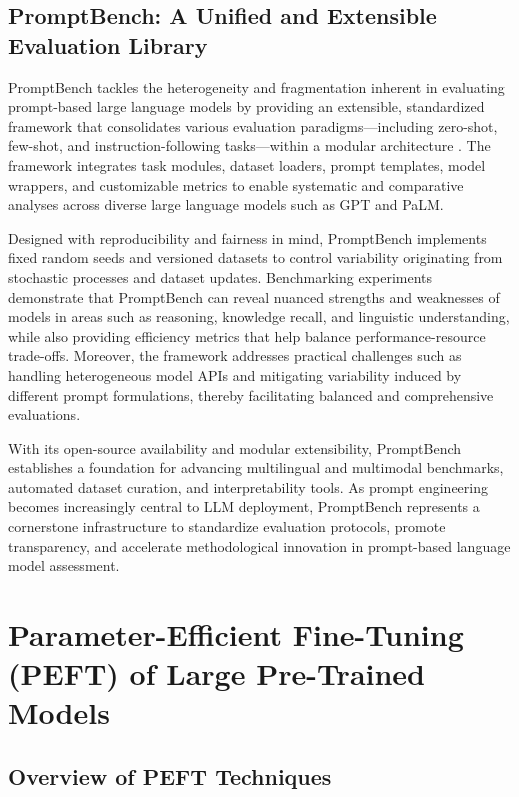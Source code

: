 \documentclass[11pt]{article}
\begin{document}
\subsection{PromptBench: A Unified and Extensible Evaluation Library}

PromptBench tackles the heterogeneity and fragmentation inherent in evaluating prompt-based large language models by providing an extensible, standardized framework that consolidates various evaluation paradigms—including zero-shot, few-shot, and instruction-following tasks—within a modular architecture \cite{ref6}. The framework integrates task modules, dataset loaders, prompt templates, model wrappers, and customizable metrics to enable systematic and comparative analyses across diverse large language models such as GPT and PaLM.

Designed with reproducibility and fairness in mind, PromptBench implements fixed random seeds and versioned datasets to control variability originating from stochastic processes and dataset updates. Benchmarking experiments demonstrate that PromptBench can reveal nuanced strengths and weaknesses of models in areas such as reasoning, knowledge recall, and linguistic understanding, while also providing efficiency metrics that help balance performance-resource trade-offs. Moreover, the framework addresses practical challenges such as handling heterogeneous model APIs and mitigating variability induced by different prompt formulations, thereby facilitating balanced and comprehensive evaluations.

With its open-source availability and modular extensibility, PromptBench establishes a foundation for advancing multilingual and multimodal benchmarks, automated dataset curation, and interpretability tools. As prompt engineering becomes increasingly central to LLM deployment, PromptBench represents a cornerstone infrastructure to standardize evaluation protocols, promote transparency, and accelerate methodological innovation in prompt-based language model assessment.

\section{Parameter-Efficient Fine-Tuning (PEFT) of Large Pre-Trained Models}

\subsection{Overview of PEFT Techniques}
\end{document}
